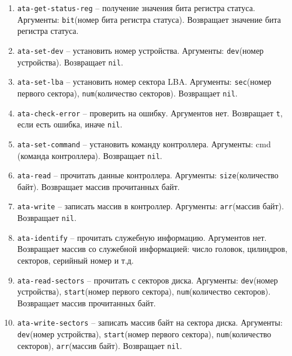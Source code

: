 \begin{enumerate}
	\item \texttt{ata-get-status-reg} -- получение значения бита регистра статуса. Аргументы: \texttt{bit}(номер бита регистра статуса). Возвращает значение бита регистра статуса.
	\item \texttt{ata-set-dev} -- установить номер устройства. Аргументы: \texttt{dev}(номер устройства). Возвращает \texttt{nil}.
	\item \texttt{ata-set-lba} -- установить номер сектора LBA. Аргументы: \texttt{sec}(номер первого сектора), \texttt{num}(количество секторов). Возвращает \texttt{nil}.
	\item \texttt{ata-check-error} -- проверить на ошибку. Аргументов нет. Возвращает \texttt{t}, если есть ошибка, иначе \texttt{nil}.
	\item \texttt{ata-set-command} -- установить команду контроллера. Аргументы: cmd (команда контроллера). Возвращает \texttt{nil}.
	\item \texttt{ata-read} -- прочитать данные контроллера. Аргументы: \texttt{size}(количество байт). Возвращает массив прочитанных байт.
	\item \texttt{ata-write} -- записать массив в контроллер. Аргументы: \texttt{arr}(массив байт). Возвращает \texttt{nil}.
	\item \texttt{ata-identify} -- прочитать служебную информацию. Аргументов нет. Возвращает массив со служебной информацией: число головок, цилиндров, секторов, серийный номер и т.д.
	\item \texttt{ata-read-sectors} -- прочитать с секторов диска. Аргументы: \texttt{dev}(номер устройства), \texttt{start}(номер первого сектора), \texttt{num}(количество секторов). Возвращает массив прочитанных байт.
	\item \texttt{ata-write-sectors} -- записать массив байт на сектора диска. Аргументы: \texttt{dev}(номер устройства), \texttt{start}(номер первого сектора), \texttt{num}(количество секторов), \texttt{arr}(массив байт). Возвращает \texttt{nil}.
\end{enumerate}